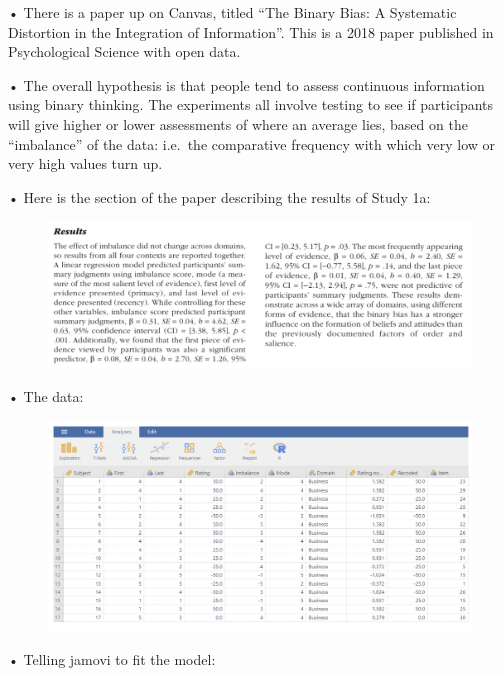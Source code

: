 \documentclass[
  letterpaper,
  DIV=11,
  numbers=noendperiod]{scrreprt}
\begin{document}
• There is a paper up on Canvas, titled ``The Binary Bias: A Systematic
Distortion in the Integration of Information''. This is a 2018 paper
published in Psychological Science with open data.

• The overall hypothesis is that people tend to assess continuous
information using binary thinking. The experiments all involve testing
to see if participants will give higher or lower assessments of where an
average lies, based on the ``imbalance'' of the data: i.e.~the
comparative frequency with which very low or very high values turn up.

• Here is the section of the paper describing the results of Study 1a:

\begin{figure}

{\centering \includegraphics{images/Mod2_pt1_6.png}

}

\end{figure}

• The data:

\begin{figure}

{\centering \includegraphics{images/Mod2_pt1_7.png}

}

\end{figure}

• Telling jamovi to fit the model:
\end{document}
